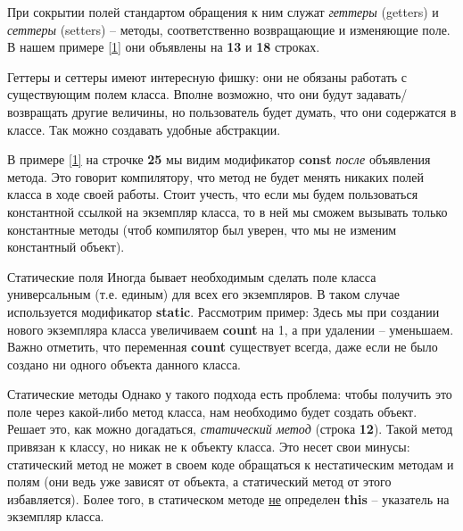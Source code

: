 \begin{lecture}[\lectureSubject]
\begin{lecSection}
		При сокрытии полей стандартом обращения к ним служат \textit{геттеры} (getters) и \textit{сеттеры} (setters) -- методы, соответственно возвращающие и изменяющие поле. В нашем примере \ref{1} они объявлены на \textbf{13} и \textbf{18} строках.
		
		 Геттеры и сеттеры имеют интересную фишку: они не обязаны работать с существующим полем класса. Вполне возможно, что они будут задавать/возвращать другие величины, но пользователь будет думать, что они содержатся в классе. Так можно создавать удобные абстракции.
		
		\end{lecSection}
		
		\begin{lecSection}
			В примере \ref{1} на строчке \textbf{25} мы видим модификатор \textbf{const} \textit{после} объявления метода. Это говорит компилятору, что метод не будет менять никаких полей класса в ходе своей работы. Стоит учесть, что если мы будем пользоваться константной ссылкой на экземпляр класса, то в ней мы сможем вызывать только константные методы (чтоб компилятор был уверен, что мы не изменим константный объект).
		\end{lecSection}
		
		\begin{lecSection}
			\begin{lecSubsection}{Статические поля}
				Иногда бывает необходимым сделать поле класса универсальным (т.е. единым) для всех его экземпляров. В таком случае используется модификатор \textbf{static}. Рассмотрим пример:
				Здесь мы при создании нового экземпляра класса увеличиваем \textbf{count} на 1, а при удалении -- уменьшаем. Важно отметить, что переменная \textbf{count} существует всегда, даже если не было создано ни одного объекта данного класса.
			\end{lecSubsection}
			\begin{lecSubsection}{Статические методы}
				Однако у такого подхода есть проблема: чтобы получить это поле через какой-либо метод класса, нам необходимо будет создать объект. Решает это, как можно догадаться, \textit{статический метод} (строка \textbf{12}). Такой метод привязан к классу, но никак не к объекту класса. Это несет свои минусы: статический метод не может в своем коде обращаться к нестатическим методам и полям (они ведь уже зависят от объекта, а статический метод от этого избавляется). Более того, в статическом методе \underline{не} определен \textbf{this} -- указатель на экземпляр класса.
			\end{lecSubsection}
			

\end{lecSection}
\end{lecture}

